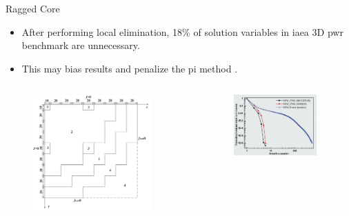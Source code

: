 \begin{frame}{Ragged Core}
  \begin{itemize}
    \item After performing local elimination, 18\% of solution variables in
      \gls{iaea} 3D \gls{pwr} benchmark are unnecessary.
    \item This may bias results and penalize the \gls{pi} method
      \cite{gehinThesis}.
  \end{itemize}
  \begin{columns}
    \begin{column}{0.5\textwidth}
      \begin{figure}
        \centering
        \includegraphics[width=0.9\textwidth]{./figs/iaea3d_ragged_core}
      \end{figure}
    \end{column}
    \begin{column}{0.5\textwidth}
      \begin{figure}
        \centering
        \includegraphics[width=0.9\textwidth]{./figs/iaea3d_convergence}
      \end{figure}
    \end{column}
  \end{columns}
\end{frame}

